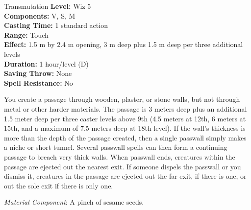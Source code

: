 {Transmutation}
{
	\textbf{Level:}
	Wiz 5\\
	\textbf{Components:}
	V, S, M\\
	\textbf{Casting Time:}
	1 standard action\\
	\textbf{Range:}
	Touch\\
	\textbf{Effect:}
	1.5 m by 2.4 m opening, 3 m deep plus 1.5 m deep per three additional levels\\
	\textbf{Duration:}
	1 hour/level (D)\\
	\textbf{Saving Throw:}
	None\\
	\textbf{Spell Resistance:}
	No\\
}
{
	You create a passage through wooden, plaster, or stone walls, but not through metal or other harder materials. The passage is 3 meters deep plus an additional 1.5 meter deep per three caster levels above 9th (4.5 meters at 12th, 6 meters at 15th, and a maximum of 7.5 meters deep at 18th level). If the wall's thickness is more than the depth of the passage created, then a single passwall simply makes a niche or short tunnel. Several passwall spells can then form a continuing passage to breach very thick walls. When passwall ends, creatures within the passage are ejected out the nearest exit. If someone dispels the passwall or you dismiss it, creatures in the passage are ejected out the far exit, if there is one, or out the sole exit if there is only one.

	\textit{Material Component}:
	A pinch of sesame seeds.

}
